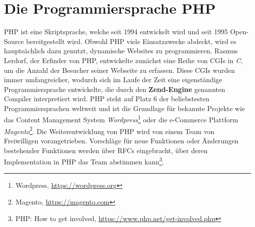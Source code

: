 \section{Die Programmiersprache PHP}
\ac{PHP} ist eine Skriptsprache, welche seit 1994 entwickelt wird und seit 1995 Open-Source bereitgestellt wird.
Obwohl \ac{PHP} viele Einsatzzwecke abdeckt, wird es hauptsächlich dazu genutzt, dynamische Websites zu programmieren. 
Rasmus Lerdorf, der Erfinder von \ac{PHP}, entwickelte zunächst eine Reihe von \acp{CGI} in \textit{C}, um die Anzahl der 
Besucher seiner Webseite zu erfassen. Diese \acp{CGI} wurden immer umfangreicher, wodurch sich im Laufe der Zeit eine 
eigenständige Programmiersprache entwickelte, die durch den \textbf{Zend-Engine} genannten Compiler interpretiert wird.
\ac{PHP} steht auf Platz 6 der beliebstesten Programmiersprachen weltweit\cite{carbonnelle_pypl_2019} und ist die Grundlage
für bekannte Projekte wie das Content Management System \textit{Wordpress}\footnote{Wordpress, \url{https://wordpress.org}}
oder die e-Commerce Plattform \textit{Magento}\footnote{Magento, \url{https://magento.com}}. Die Weiterentwicklung 
von \ac{PHP} wird von einem Team von Freiwilligen vorangetrieben. Vorschläge für neue Funktionen oder Änderungen bestehender 
Funktionen werden über \acp{RFC} eingebracht, über deren Implementation in \ac{PHP} das Team abstimmen kann\footnote{PHP: How to get involved, \url{https://www.php.net/get-involved.php}}.

